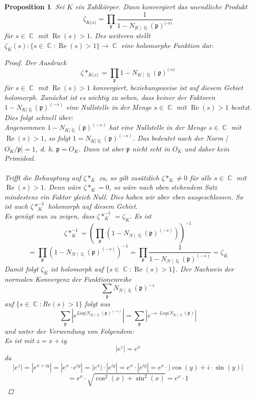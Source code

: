 \documentclass[10pt,a4paper]{article}
\theoremstyle{plain}
\newtheorem{prop}[thm]{Proposition}
\theoremstyle{definition}
\theoremstyle{remark}
\DeclareMathOperator{\C}{\mathbb{C}}
\DeclareMathOperator{\Q}{\mathbb{Q}}
\DeclareMathOperator{\re}{Re}
\begin{document}
\begin{prop}

Sei $\textit{K}$ ein Zahlkörper. Dann konvergiert das unendliche Produkt $$\zeta_{\textit{K} \textit{(s)}}= \prod_{\mathfrak{p}}\frac{1}{1- N_{\textit{K}\mid\Q}(\mathfrak{p})^\textit{(-s)}}$$ für $s \in \C $ mit $ \re(s) > 1$. Des weiteren stellt $\zeta_{K}(s)\colon \{ s \in \C \colon \re(s)>1\} \rightarrow \C$ eine holomorphe Funktion dar.

\begin{proof}\label{proofprop14}
Der Ausdruck
$$\zeta*_{\textit{K} \textit{(s)}}= \prod_{\mathfrak{p}}1- N_{\textit{K}\mid\Q}(\mathfrak{p})^\textit{(-s)}$$ für $s \in \C $ mit $\re(s) > 1$ konvergiert, beziehungsweise ist auf diesem Gebiet holomorph.
Zunächst ist es wichtig zu sehen, dass keiner der Faktoren $1- N_{K|\Q}(\mathfrak{p})^{(-s)}$ eine Nullstelle in der Menge $s \in \C $ mit $\re(s) > 1$ besitzt.
\\
Dies folgt schnell über: 
\\
Angenommen $1- N_{K|\Q}(\mathfrak{p})^{(-s)}$ hat eine Nullstelle in der Menge  $s \in \C $ mit $ \re(s) > 1$, so folgt $1 = N_{K|\Q}(\mathfrak{p})^{(-s)}$. Das bedeutet nach der Norm |$O_K /\mathfrak{p}| = 1$, d. h. $\mathfrak{p} = O_K$. Dann ist aber $\mathfrak{p}$ nicht echt in $O_K$ und daher kein Primideal. \\
\\
Trifft die Behauptung auf $\zeta*_{K}$ zu, so gilt zusätzlich $\zeta*_{K} \neq 0$ für alle  $s \in \C $ mit $ \re(s) > 1$. Denn wäre  $\zeta*_{K} = 0$, so wäre nach oben stehendem Satz mindestens ein Faktor gleich Null. Dies haben wir aber eben ausgeschlossen. So ist auch  $\zeta*_{K}^{-1}$ holomorph auf diesem Gebiet. \\Es genügt nun zu zeigen, dass 
$\zeta*_{K}^{-1}$ = $\zeta_{K}$. Es ist $$\zeta*_{K}^{-1}=(\prod_{\mathfrak{p}}(1 - N_{N\mid\Q}(\mathfrak{p})^{(-s)}))^{-1} $$ $$=\prod_{\mathfrak{p}}(1 - N_{N\mid\Q}(\mathfrak{p})^{(-s)})^{-1} = \prod_{\mathfrak{p}}\frac{1}{1 - N_{N\mid\Q}(\mathfrak{p})^{(-s)}}=\zeta_{K}$$
Damit folgt $\zeta_{K}$ ist holomorph auf $\{ s \in \C \colon \re(s) > 1\}$. Der Nachweis der normalen Konvergenz der Funktionenreihe $$\sum_{\mathfrak{p}}N_{N\mid\Q}(\mathfrak{p})^{-s}$$ auf $\{ s \in \C \colon Re(s) > 1\}$ folgt aus $$\sum_{\mathfrak{p}}|e^{Log(N_{K\mid \Q}(\mathfrak{p})^{(-s)}}| = \sum_{\mathfrak{p}}|e^{-s\cdot Log(N_{K\mid \Q}(\mathfrak{p})}|$$
 und unter der Verwendung von Folgendem: \\Es ist mit $z = x + iy$ $$|e^z| = e^x $$ da $$|e^z|=|e^{x+iy}|=|e^{x}\cdot e^{iy}|= |e^{x}|\cdot |e^{iy}| = e^{x}\cdot |e^{iy}| = e^x \cdot |\cos(y)+i \cdot \sin(y)| $$ $$= e^x\cdot\sqrt{\cos^2(x)+\sin^2(x)} =e^x\cdot 1$$

\end{proof}
\end{prop}
\end{document}
